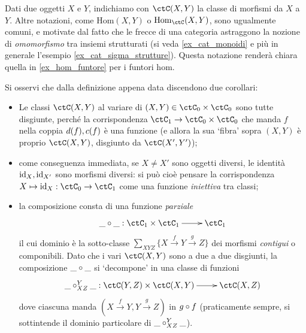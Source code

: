 \begin{notation}
	Dati due oggetti \(X\) e \(Y\), indichiamo con \(\Hom{\ctC}(X,Y)\) la classe di morfismi da \(X\) a \(Y\). Altre notazioni, come \(\mathrm{Hom}(X,Y)\) o \(\mathrm{Hom}_\ctC(X,Y)\), sono ugualmente comuni, e motivate dal fatto che le frecce di una categoria astraggono la nozione di \emph{omomorfismo} tra insiemi strutturati (si veda \ref{ex_cat_monoidi} e più in generale l'esempio \ref{ex_cat_sigma_strutture}). Questa notazione renderà chiara quella in \ref{ex_hom_funtore} per i funtori hom.
\end{notation}
\begin{remark}\label{cor_def_categ}
	Si osservi che dalla definizione appena data discendono due corollari:
	\begin{itemize}
		\item Le classi \(\Hom{\ctC}(X,Y)\) al variare di \((X,Y)\in\ctC_0\times\ctC_0\) sono tutte disgiunte, perché la corrispondenza \(\ctC_1 \to \ctC_0\times\ctC_0\) che manda \(f\) nella coppia \(d(f),c(f)\) è una funzione (e allora la sua `fibra' sopra \((X,Y)\) è proprio \(\Hom{\ctC}(X,Y)\), disgiunto da \(\Hom{\ctC}(X',Y')\));
		\item come conseguenza immediata, se \(X\ne X'\) sono oggetti diversi, le identità \(\mathrm{id}_X,\mathrm{id}_{X'}\) sono morfismi diversi: si può cioè pensare la corrispondenza \(X\mapsto \id_X : \ctC_0\to\ctC_1\) come una funzione \emph{iniettiva} tra classi;
		\item la composizione consta di una funzione \emph{parziale}
		      \[\xymatrix{\_\cmp\_ : \ctC_1 \times \ctC_1 \ar[r] & \ctC_1}\]
		      il cui dominio è la sotto-classe \(\sum_{XYZ} \{ X \xrightarrow f Y \xrightarrow g Z \}\) dei morfismi \emph{contigui} o componibili. Dato che i vari \(\ctC(X,Y)\) sono a due a due disgiunti, la composizione \(\_\circ\_\) si `decompone' in una classe di funzioni
		      \[\xymatrix{\_\cmp_{XZ}^Y\_ : \ctC(Y,Z)\times\ctC(X,Y) \ar[r] & \ctC(X,Z)}\]
		      dove ciascuna manda \(( X \xrightarrow f Y, Y \xrightarrow g Z )\) in \(g\circ f\) (praticamente sempre, si sottintende il dominio particolare di \(\_\circ_{XZ}^Y\_\)).
	\end{itemize}
\end{remark}
